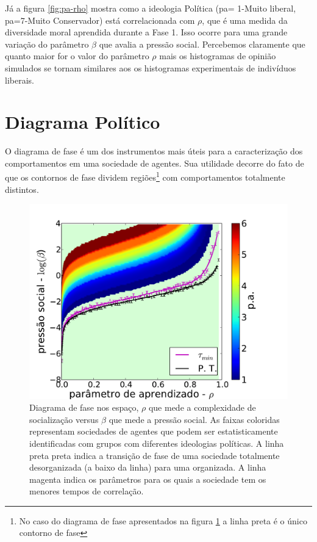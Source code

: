 Já a figura \ref{fig:pa-rho} mostra como a ideologia Política (pa= 1-Muito
liberal, pa=7-Muito Conservador) está correlacionada com  $\rho$, que é
uma medida da diversidade moral aprendida durante a Fase 1. Isso ocorre
para uma grande variação do parâmetro $\beta$ que avalia a pressão
social. Percebemos claramente que quanto maior for o valor do parâmetro
$\rho$ mais os histogramas de opinião simulados se tornam similares aos
os histogramas experimentais de indivíduos liberais.

\newpage
\section{Diagrama Político}

O diagrama de fase é um dos instrumentos mais úteis para a caracterização dos
comportamentos em uma sociedade de agentes. Sua utilidade decorre do fato de
que os contornos de fase dividem regiões\footnote{No caso do diagrama de fase
apresentados na figura \ref{fig:diagfase} a linha preta é o único contorno de
fase} com comportamentos totalmente distintos.

\begin{figure}
    \centering
    \includegraphics[scale=0.6]{Figures/padiag2.pdf}
    \caption{ 
        Diagrama de fase nos espaço, $\rho$ que mede a complexidade
        de socialização versus $\beta$ que mede a pressão social. As
        faixas coloridas representam sociedades de agentes que podem ser
        estatisticamente identificadas com grupos com diferentes ideologias
        políticas. A linha preta preta indica a transição de fase de
        uma sociedade totalmente desorganizada (a baixo da linha) para uma
        organizada. A linha magenta indica os parâmetros para os quais a
        sociedade tem os menores tempos de correlação.
    }
    \label{fig:diagfase}
\end{figure}


